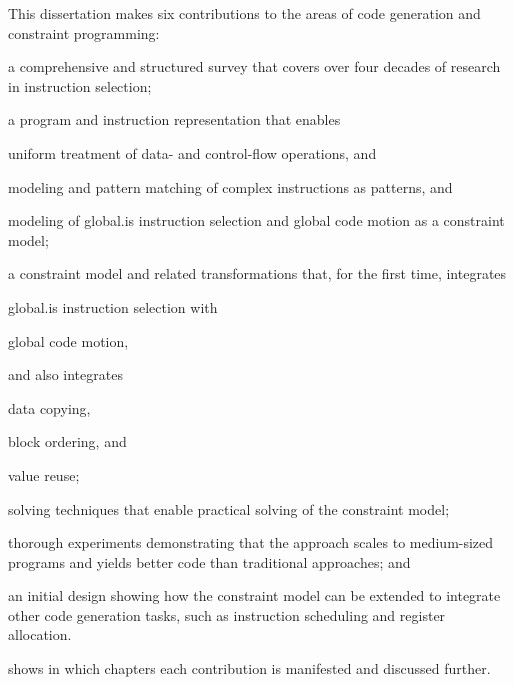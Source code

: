 This dissertation makes six contributions to the areas of code generation and
constraint programming:
%
\begin{contributions}
\item {}
    a comprehensive and structured survey that covers over four decades of
    research in \gls{instruction selection};
  \item {}
    a program and instruction representation that enables
    \begin{contributions}
      \item {}
        uniform treatment of data- and control-flow \glspl{operation}, and
      \item {}
        modeling and pattern matching of complex \glspl{instruction} as
        \glspl{pattern}, and
      \item {}
        modeling of \gls{global.is} \gls{instruction selection} and \gls{global
          code motion} as a \gls{constraint model};
    \end{contributions}
  \item {}
    a \gls{constraint model} and related transformations that, for the first
    time, integrates
    \begin{contributions}
      \item {}
        \gls{global.is} \gls{instruction selection} with
      \item {}
        \gls{global code motion},
    \end{contributions}
    and also integrates
    \begin{contributions}[resume]
      \item {}
        \gls{data copying},
      \item {}
        \gls{block ordering}, and
      \item {}
        \gls{value reuse};
    \end{contributions}
  \item {}
    solving techniques that enable practical solving of the \gls{constraint
      model};
  \item {}
    thorough experiments demonstrating that the approach scales to medium-sized
    programs and yields better code than traditional approaches; and
  \item {}
    an initial design showing how the \gls{constraint model} can be extended to
    integrate other code generation tasks, such as \gls{instruction scheduling}
    and \gls{register allocation}.
\end{contributions}
%
 shows in which chapters each contribution
is manifested and discussed further.


